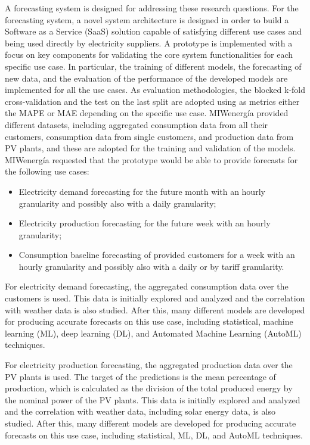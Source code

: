 A forecasting system is designed for addressing these research questions.
For the forecasting system, a novel system architecture is designed in order to build a Software as a Service (SaaS) solution capable of satisfying different use cases and being used directly by electricity suppliers.
A prototype is implemented with a focus on key components for validating the core system functionalities for each specific use case.
In particular, the training of different models, the forecasting of new data, and the evaluation of the performance of the developed models are implemented for all the use cases.
As evaluation methodologies, the blocked k-fold cross-validation and the test on the last split are adopted using as metrics either the MAPE or MAE depending on the specific use case.
MIWenergía provided different datasets, including aggregated consumption data from all their customers, consumption data from single customers, and production data from PV plants, and these are adopted for the training and validation of the models.
MIWenergía requested that the prototype would be able to provide forecasts for the following use cases:
\begin{itemize}
  \item Electricity demand forecasting for the future month with an hourly granularity and possibly also with a daily granularity;
  \item Electricity production forecasting for the future week with an hourly granularity;
  \item Consumption baseline forecasting of provided customers for a week with an hourly granularity and possibly also with a daily or by tariff granularity.
\end{itemize}


For electricity demand forecasting, the aggregated consumption data over the customers is used.
This data is initially explored and analyzed and the correlation with weather data is also studied.
After this, many different models are developed for producing accurate forecasts on this use case, including statistical, machine learning (ML), deep learning (DL), and Automated Machine Learning (AutoML) techniques.

For electricity production forecasting, the aggregated production data over the PV plants is used.
The target of the predictions is the mean percentage of production, which is calculated as the division of the total produced energy by the nominal power of the PV plants.
This data is initially explored and analyzed and the correlation with weather data, including solar energy data, is also studied.
After this, many different models are developed for producing accurate forecasts on this use case, including statistical, ML, DL, and AutoML techniques.

